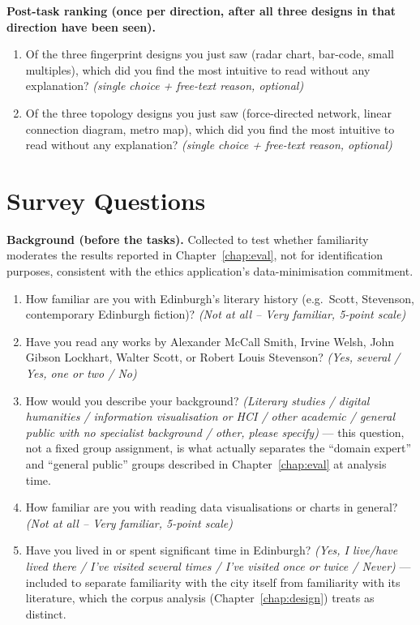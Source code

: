\documentclass[logo,msc]{infthesis}
\begin{document}
\textbf{Post-task ranking (once per direction, after all three designs in that direction have been seen).}
\begin{enumerate}
  \item Of the three fingerprint designs you just saw (radar chart, bar-code, small multiples), which did you find the most intuitive to read without any explanation? \emph{(single choice + free-text reason, optional)}
  \item Of the three topology designs you just saw (force-directed network, linear connection diagram, metro map), which did you find the most intuitive to read without any explanation? \emph{(single choice + free-text reason, optional)}
\end{enumerate}

\section{Survey Questions}

\textbf{Background (before the tasks).} Collected to test whether familiarity moderates the results reported in Chapter~\ref{chap:eval}, not for identification purposes, consistent with the ethics application's data-minimisation commitment.
\begin{enumerate}
  \item How familiar are you with Edinburgh's literary history (e.g.\ Scott, Stevenson, contemporary Edinburgh fiction)? \emph{(Not at all -- Very familiar, 5-point scale)}
  \item Have you read any works by Alexander McCall Smith, Irvine Welsh, John Gibson Lockhart, Walter Scott, or Robert Louis Stevenson? \emph{(Yes, several / Yes, one or two / No)}
  \item How would you describe your background? \emph{(Literary studies / digital humanities / information visualisation or HCI / other academic / general public with no specialist background / other, please specify)} --- this question, not a fixed group assignment, is what actually separates the ``domain expert'' and ``general public'' groups described in Chapter~\ref{chap:eval} at analysis time.
  \item How familiar are you with reading data visualisations or charts in general? \emph{(Not at all -- Very familiar, 5-point scale)}
  \item Have you lived in or spent significant time in Edinburgh? \emph{(Yes, I live/have lived there / I've visited several times / I've visited once or twice / Never)} --- included to separate familiarity with the city itself from familiarity with its literature, which the corpus analysis (Chapter~\ref{chap:design}) treats as distinct.
\end{enumerate}
\end{document}
